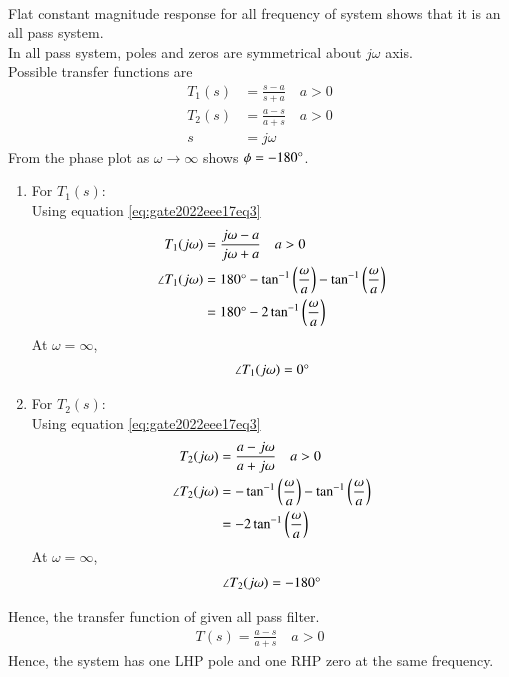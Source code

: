 \documentclass[journal,12pt,onecolumn]{IEEEtran}
\newcommand{\system}[1]{\stackrel{#1}{\rightarrow}}
\theoremstyle{remark}
\begin{document}
\solution\\
Flat constant magnitude response for all frequency of system shows that it is an all pass system.\\
In all pass system, poles and zeros are symmetrical about $j\omega$ axis.\\
Possible transfer functions are\\
\begin{align}
T_1 (s)&=\frac{s-a}{s+a} \quad a>0 \label{eq:gate2022eee17eq1}\\
T_2 (s)&=\frac{a-s}{a+s} \quad a>0 \label{eq:gate2022eee17eq2}\\
s&=j\omega\label{eq:gate2022eee17eq3}
\end{align}
From the phase plot as $\omega \system{} \infty$ shows $\phi= -180\degree$.\\
\begin{enumerate}
\item For $T_1(s)$:\\
Using equation \eqref{eq:gate2022eee17eq3}\\
\begin{align}
T_1 (j \omega)&=\frac{j \omega -a}{j \omega +a} \quad a>0 \\
\angle T_1(j\omega)&=180\degree - \tan^{-1}\left(\frac{\omega}{a}\right)-\tan^{-1}\left(\frac{\omega}{a}\right)\\
&=180\degree - 2\tan^{-1}\left(\frac{\omega}{a}\right)
\end{align}
At $\omega=\infty$,
\begin{align}
\angle T_1(j\omega)=0\degree
\end{align}
\item For $T_2(s)$:\\
Using equation \eqref{eq:gate2022eee17eq3}\\
\begin{align}
T_2 (j \omega)&=\frac{a-j \omega }{a+j \omega} \quad a>0 \\
\angle T_2(j\omega)&=- \tan^{-1}\left(\frac{\omega}{a}\right)-\tan^{-1}\left(\frac{\omega}{a}\right)\\
&=- 2\tan^{-1}\left(\frac{\omega}{a}\right)
\end{align}
At $\omega=\infty$,
\begin{align}
\angle T_2(j\omega)=-180\degree
\end{align}
\end{enumerate}
Hence, the transfer function of given all pass filter.\\
\begin{align}
T(s)=\frac{a-s}{a+s} \quad a>0
\end{align}
Hence, the system has one LHP pole and one RHP zero at the same frequency.
\end{document}
